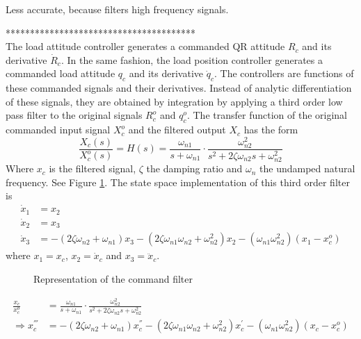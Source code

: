 Less accurate, because filters high frequency signals.

***************************************\\

The load attitude controller generates a commanded QR attitude $ R_c $ and its derivative $ \dot{R}_c $. In the same fashion, the load position controller generates a commanded load attitude $ q_c $ and its derivative $ \dot{q}_c $. The controllers are functions of these commanded signals and their derivatives. Instead of analytic differentiation of these signals, they are obtained by integration by applying a third order low pass filter to the original signals $ R_c^o $ and $ q_c^o $. The transfer function of the original commanded input signal $ X_c^o $ and the filtered output $ X_c $ has the form
\begin{equation}\label{key}
\frac{X_c(s)}{X_c^o(s)}=H(s)=\frac{\omega_{n1}}{s+\omega_{n1}}\cdot\frac{\omega_{n2}^2}{s^2+2\zeta\omega_{n2}s+\omega_{n2}^2}
\end{equation}
Where $ x_c $ is the filtered signal, $ \zeta $ the damping ratio and $ \omega_n $ the undamped natural frequency. See Figure \ref{fig:CF}.
The state space implementation of this third order filter is \cite{Djapic2008}
\begin{align}\label{key}
\dot{x}_1 &= x_2\\ %
\dot{x}_2 &= x_3\\ %
\dot{x}_3 &= -(2\zeta \omega_{n2}+\omega_{n1})x_3-(2\zeta\omega_{n1}\omega_{n2}+\omega_{n2}^2)x_2-(\omega_{n1}\omega_{n2}^2)(x_1-x_c^o)
\end{align}
where $ x_1 = x_c$, $ x_2 = \dot{x}_c$ and $ x_3 = \ddot{x}_c$. 

\begin{figure}[h!]
	\centering
	\caption{Representation of the command filter\label{fig:CF}}
\end{figure}		

\begin{align}\label{eq:CF}
\frac{x_c}{x_c^o}&=\frac{\omega_{n1}}{s+\omega_{n1}}\cdot\frac{\omega_{n2}^2}{s^2+2\zeta\omega_{n2}s+\omega_{n2}^2}\\
\Rightarrow x_c^{'''}&=-(2\zeta\omega_{n2}+\omega_{n1})x_c^{''}-(2\zeta\omega_{n1}\omega_{n2}+\omega_{n2}^2)x_c^{'}-(\omega_{n1}\omega_{n2} ^2)(x_c-x_c^o)
\end{align}

